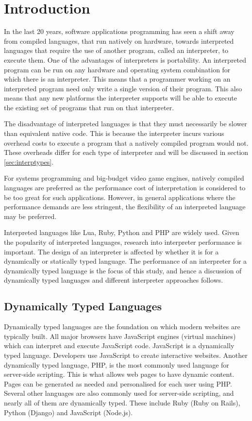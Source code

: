 \documentclass[english,a4paper,12pt]{report}
\begin{document}
\tableofcontents
\newpage{}

\chapter{Introduction}

In the last 20 years, software applications programming has seen a
shift away from compiled languages, that run natively on hardware,
towards interpreted languages that require the use of another program,
called an interpreter, to execute them. One of the advantages of
interpreters is portability. An interpreted program can be run on any
hardware and operating system combination for which there is an
interpreter. This means that a programmer working on an interpreted
program need only write a single version of their program. This also
means that any new platforms the interpreter supports will be able to
execute the existing set of programs that run on that interpreter.

The disadvantage of interpreted languages is that they must
necessarily be slower than equivalent native code. This is because the
interpreter incurs various overhead costs to execute a program that a
natively compiled program would not. These overheads differ for each
type of interpreter and will be discussed in section
\ref{sec:interptypes}. 

For systems programming and big-budget video game engines, natively
compiled languages are preferred as the performance cost of
interpretation is considered to be too great for such
applications. However, in general applications where the performance
demands are less stringent, the flexibility of an interpreted language
may be preferred.

Interpreted languages like Lua, Ruby, Python and PHP are widely
used. Given the popularity of interpreted languages, research into
interpreter performance is important. The design of an interpreter is
affected by whether it is for a dynamically or statically typed
language. The performance of an interpreter for a dynamically typed
language is the focus of this study, and hence a discussion of
dynamically typed languages and different interpreter approaches
follows.

\section{Dynamically Typed Languages}
Dynamically typed languages are the foundation on which modern
websites are typically built. All major browsers have JavaScript
engines (virtual machines) which can interpret and execute JavaScript
code. JavaScript is a dynamically typed language. Developers use
JavaScript to create interactive websites. Another dynamically typed
language, PHP, is the most commonly used language for server-side
scripting. This is what allows web pages to have dynamic
content. Pages can be generated as needed and personalised for each
user using PHP. Several other languages are also commonly used for
server-side scripting, and nearly all of them are dynamically
typed. These include Ruby (Ruby on Rails), Python (Django) and
JavaScript (Node.js).
\end{document}
